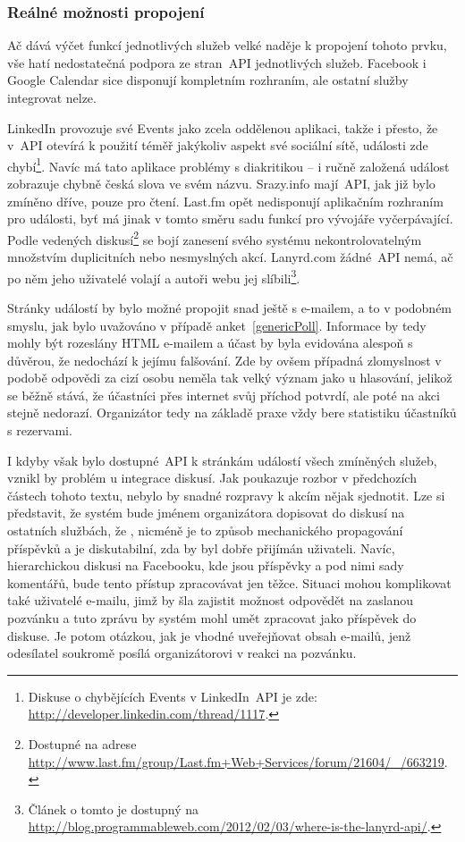 \documentclass[12pt,oneside,final]{fithesis2}
\begin{document}
\subsubsection*{Reálné možnosti propojení}
Ač dává výčet funkcí jednotlivých služeb velké naděje k propojení tohoto prvku, vše hatí nedostatečná podpora ze stran~API jednotlivých služeb. Facebook i Google Calendar sice disponují kompletním rozhraním, ale ostatní služby integrovat nelze.

LinkedIn provozuje své Events jako zcela oddělenou aplikaci, takže i přesto, že v~API otevírá k použití téměř jakýkoliv aspekt své sociální sítě, události zde chybí\footnote{Diskuse o chybějících Events v LinkedIn~API je zde: \url{http://developer.linkedin.com/thread/1117}.}. Navíc má tato aplikace problémy s diakritikou -- i ručně založená událost zobrazuje chybně česká slova ve svém názvu. Srazy.info mají~API, jak již bylo zmíněno dříve, pouze pro čtení. Last.fm opět nedisponují aplikačním rozhraním pro události, byť má jinak v tomto směru sadu funkcí pro vývojáře vyčerpávající. Podle vedených diskusí\footnote{Dostupné na adrese \url{http://www.last.fm/group/Last.fm+Web+Services/forum/21604/_/663219}.} se bojí zanesení svého systému nekontrolovatelným množstvím duplicitních nebo nesmyslných akcí. Lanyrd.com žádné~API nemá, ač po něm jeho uživatelé volají a autoři webu jej slíbili\footnote{Článek o tomto je dostupný na \url{http://blog.programmableweb.com/2012/02/03/where-is-the-lanyrd-api/}.}.

Stránky událostí by bylo možné propojit snad ještě s e-mailem, a to v podobném smyslu, jak bylo uvažováno v případě anket~\ref{genericPoll}. Informace by tedy mohly být rozeslány HTML e-mailem a účast by byla evidována alespoň s důvěrou, že nedochází k jejímu falšování. Zde by ovšem případná zlomyslnost v podobě odpovědi za cizí osobu neměla tak velký význam jako u hlasování, jelikož se běžně stává, že účastníci přes internet svůj příchod potvrdí, ale poté na akci stejně nedorazí. Organizátor tedy na základě praxe vždy bere statistiku účastníků s rezervami.

I kdyby však bylo dostupné~API k stránkám událostí všech zmíněných služeb, vznikl by problém u integrace diskusí. Jak poukazuje rozbor v předchozích částech tohoto textu, nebylo by snadné rozpravy k akcím nějak sjednotit. Lze si představit, že systém bude jménem organizátora dopisovat do diskusí na ostatních službách, že , nicméně je to způsob mechanického propagování příspěvků a je diskutabilní, zda by byl dobře přijímán uživateli. Navíc, hierarchickou diskusi na Facebooku, kde jsou příspěvky a pod nimi sady komentářů, bude tento přístup zpracovávat jen těžce. Situaci mohou komplikovat také uživatelé e-mailu, jimž by šla zajistit možnost odpovědět na zaslanou pozvánku a tuto zprávu by systém mohl umět zpracovat jako příspěvek do diskuse. Je potom otázkou, jak je vhodné uveřejňovat obsah e-mailů, jenž odesílatel soukromě posílá organizátorovi v reakci na pozvánku.
\end{document}
